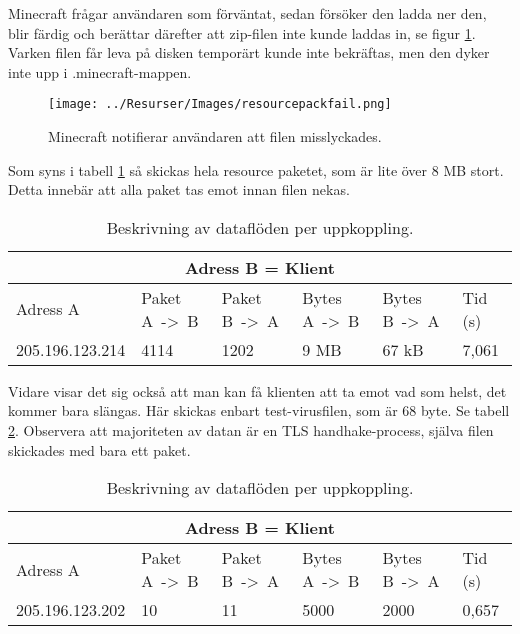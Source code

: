\documentclass[journal,comsoc]{IEEEtran}
\begin{document}
Minecraft frågar användaren som förväntat, sedan försöker den ladda ner den, blir färdig och berättar därefter att zip-filen inte kunde laddas in, se figur \ref{fig:resourcepackfail}. Varken filen får leva på disken temporärt kunde inte bekräftas, men den dyker inte upp i .minecraft-mappen. 

\begin{figure} [H]
  \centering
  \texttt{[image: ../Resurser/Images/resourcepackfail.png]}
  \caption{Minecraft notifierar användaren att filen misslyckades.}
  \label{fig:resourcepackfail}
\end{figure}

Som syns i tabell \ref{table:client:rp_virus} så skickas hela resource paketet, som är lite över 8 MB stort. Detta innebär att alla paket tas emot innan filen nekas.

\begin{table} [H]
  \begin{center}
    \label{table:client:rp_virus}
    \begin{tabular}{ | m{1.5cm} |  m{1cm} | m{1cm}| m{1cm}|m{1cm}|m{0.5cm}| } 
      \hline
      \multicolumn{6}{|c|}{Adress B = Klient} \\
      \hline
      Adress A & Paket A~->~B & Paket B~->~A & Bytes A~->~B & Bytes B~->~A & Tid (s) \\
      \hline
      205.196.123.214 & 4114 & 1202 & 9 MB  & 67 kB & 7,061 \\
      \hline 
    \end{tabular}
  \end{center}
  \caption{Beskrivning av dataflöden per uppkoppling.}
\end{table}

Vidare visar det sig också att man kan få klienten att ta emot vad som helst, det kommer bara slängas. Här skickas enbart test-virusfilen, som är 68 byte. Se tabell \ref{table:client:virus}. Observera att majoriteten av datan är en TLS handhake-process, själva filen skickades med bara ett paket. 

\begin{table} [H]
  \begin{center}
    \label{table:client:virus}
    \begin{tabular}{ | m{1.5cm} |  m{1cm} | m{1cm}| m{1cm}|m{1cm}|m{0.5cm}| } 
      \hline
      \multicolumn{6}{|c|}{Adress B = Klient} \\
      \hline
      Adress A & Paket A~->~B & Paket B~->~A & Bytes A~->~B & Bytes B~->~A & Tid (s) \\
      \hline
      205.196.123.202 & 10 & 11 & 5000 & 2000 & 0,657 \\
      \hline 
    \end{tabular}
  \end{center}
  \caption{Beskrivning av dataflöden per uppkoppling.}
\end{table}
\end{document}
